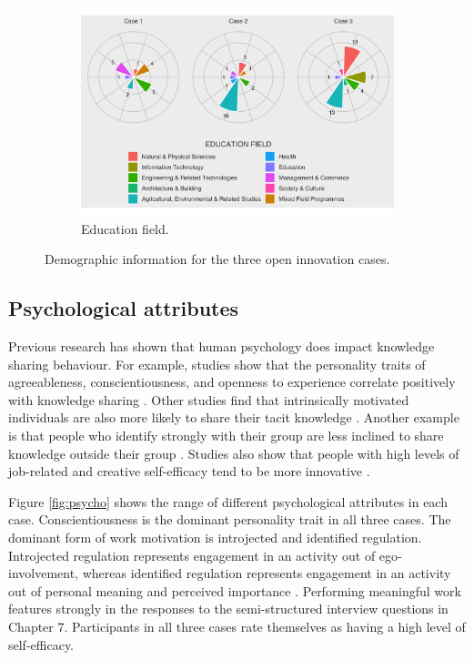 \begin{figure}
\begin{subfigure}[b]{0.7\textwidth}
\includegraphics[width=1\linewidth]{Images/ed_field.png}
\caption{Education field.}
\end{subfigure}

\caption[Demographic information for each case]{Demographic information for the three open innovation cases.}
\label{fig:demographics}
\end{figure}


\subsection{Psychological attributes}

Previous research has shown that human psychology does impact knowledge sharing behaviour. For example, studies show that the personality traits of agreeableness, conscientiousness, and openness to experience correlate positively with knowledge sharing \citep{matzler2011personality,borges2012tacit}. Other studies find that intrinsically motivated individuals are also more likely to share their tacit knowledge \citep{hung2011influence,llopis2016understanding}. Another example is that people who identify strongly with their group are less inclined to share knowledge outside their group \citep{kane2005knowledge,argote2009superordinate,dokko2014one}. Studies also show that people with high levels of job-related and creative self-efficacy tend to be more innovative \citep{farmer2006developing, leonard2014knowledge}. \medskip

Figure \ref{fig:psycho} shows the range of different psychological attributes in each case. Conscientiousness is the dominant personality trait in all three cases. The dominant form of work motivation is introjected and identified regulation. Introjected regulation represents engagement in an activity out of ego‐involvement, whereas identified regulation represents engagement in an activity out of personal meaning and perceived importance \citep{gagne2019different}. Performing meaningful work features strongly in the responses to the semi-structured interview questions in Chapter 7. Participants in all three cases rate themselves as having a high level of self-efficacy. \medskip

